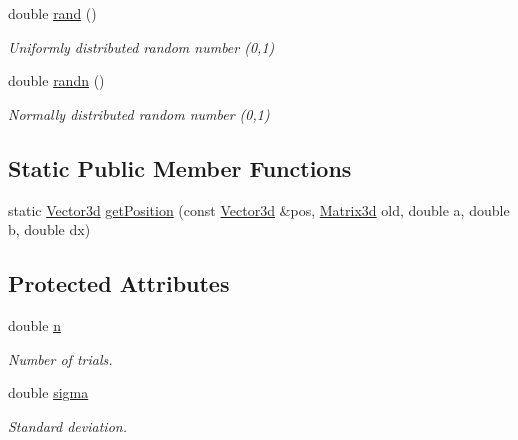 \begin{DoxyCompactItemize}
\mbox{\label{classCPlantBox_1_1StemTropismFunction_ae5b7342f6a8d34c2b8bec79e2d1882d7}} 
double \hyperlink{classCPlantBox_1_1StemTropismFunction_ae5b7342f6a8d34c2b8bec79e2d1882d7}{rand} ()
\begin{DoxyCompactList}\small\item\em Uniformly distributed random number (0,1) \end{DoxyCompactList}\item 
\mbox{\label{classCPlantBox_1_1StemTropismFunction_a8d3817fc56283a1fe8808981de4e3a23}} 
double \hyperlink{classCPlantBox_1_1StemTropismFunction_a8d3817fc56283a1fe8808981de4e3a23}{randn} ()
\begin{DoxyCompactList}\small\item\em Normally distributed random number (0,1) \end{DoxyCompactList}\end{DoxyCompactItemize}
\subsection*{Static Public Member Functions}
\begin{DoxyCompactItemize}
\item 
static \hyperlink{classCPlantBox_1_1Vector3d}{Vector3d} \hyperlink{classCPlantBox_1_1StemTropismFunction_a737777a15a7e644e271d1fd3f6a777e9}{get\+Position} (const \hyperlink{classCPlantBox_1_1Vector3d}{Vector3d} \&pos, \hyperlink{classCPlantBox_1_1Matrix3d}{Matrix3d} old, double a, double b, double dx)
\end{DoxyCompactItemize}
\subsection*{Protected Attributes}
\begin{DoxyCompactItemize}
\item 
\mbox{\label{classCPlantBox_1_1StemTropismFunction_a54ebffbb66feb026ce61d57f17d4d25a}} 
double \hyperlink{classCPlantBox_1_1StemTropismFunction_a54ebffbb66feb026ce61d57f17d4d25a}{n}
\begin{DoxyCompactList}\small\item\em Number of trials. \end{DoxyCompactList}\item 
\mbox{\label{classCPlantBox_1_1StemTropismFunction_a79ea448c44b07fb59d85e9d130190994}} 
double \hyperlink{classCPlantBox_1_1StemTropismFunction_a79ea448c44b07fb59d85e9d130190994}{sigma}
\begin{DoxyCompactList}\small\item\em Standard deviation. \end{DoxyCompactList}\end{DoxyCompactItemize}


